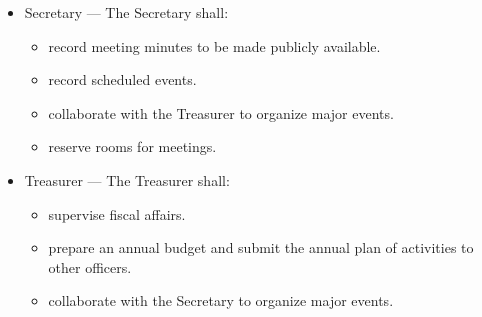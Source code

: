 \documentclass{article}
\begin{document}
{\begin{itemize}
{\begin{itemize}
  \item{during periods of transition, ensure all documents are up to date.}

  \end{itemize}

}

\item{

  Secretary --- The Secretary shall:

  \begin{itemize}

  \item{record meeting minutes to be made publicly available.}

  \item{record scheduled events.}

  \item{collaborate with the Treasurer to organize major events.}

  \item{reserve rooms for meetings.}

  \end{itemize}

}

\item{

  Treasurer --- The Treasurer shall:

  \begin{itemize}

  \item{supervise fiscal affairs.}

  \item{prepare an annual budget and submit the annual plan of activities to other officers.}

  \item{collaborate with the Secretary to organize major events.}

  \end{itemize}

}

\end{itemize}

}


\end{document}
